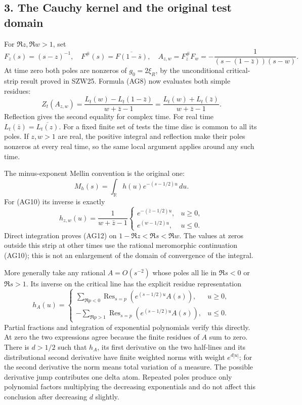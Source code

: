 \documentclass[
  10pt,
  a4paper,
]{article}
\begin{document}
\subsection{3. The Cauchy kernel and the original test
domain}\label{the-cauchy-kernel-and-the-original-test-domain}

For \(\Re z,\Re w>1\), set \[
F_z(s)=(s-z)^{-1},\quad F^\#(s)=\overline{F(1-\bar s)},\quad
A_{z,w}=F_z^\#F_w=-\frac1{(s-(1-\bar z))(s-w)}.
\tag{AG10}
\] At time zero both poles are nonzeros of \(g_0=2\xi_R\), by the
unconditional critical-strip result proved in SZW25. Formula (AG8) now
evaluates both simple residues: \[
Z_t(A_{z,w})=
\frac{L_t(w)-L_t(1-\bar z)}{w+\bar z-1}
=\frac{L_t(w)+L_t(\bar z)}{w+\bar z-1}.
\tag{AG11}
\] Reflection gives the second equality for complex time. For real time
\(L_t(\bar z)=\overline{L_t(z)}\). For a fixed finite set of tests the
time disc is common to all its poles. If \(z,w>1\) are real, the
positive integral and reflection make their poles nonzeros at every real
time, so the same local argument applies around any such time.

The minus-exponent Mellin convention is the original one: \[
M_h(s)=\int_{\mathbb R}h(u)e^{-(s-1/2)u}\,du.
\tag{AG12}
\] For (AG10) its inverse is exactly \[
h_{z,w}(u)=\frac1{w+\bar z-1}
\begin{cases}e^{-(\bar z-1/2)u},&u\ge0,\\
e^{(w-1/2)u},&u\le0.
\end{cases}
\tag{AG13}
\] Direct integration proves (AG12) on \(1-\Re z<\Re s<\Re w\). The
values at zeros outside this strip at other times use the rational
meromorphic continuation (AG10); this is not an enlargement of the
domain of convergence of the integral.

More generally take any rational \(A=O(s^{-2})\) whose poles all lie in
\(\Re s<0\) or \(\Re s>1\). Its inverse on the critical line has the
explicit residue representation \[
h_A(u)=
\begin{cases}
\displaystyle\sum_{\Re p<0}\operatorname{Res}_{s=p}
\left(e^{(s-1/2)u}A(s)\right),&u\ge0,\\
\displaystyle-\sum_{\Re p>1}\operatorname{Res}_{s=p}
\left(e^{(s-1/2)u}A(s)\right),&u\le0.
\end{cases}
\tag{AG14}
\] Partial fractions and integration of exponential polynomials verify
this directly. At zero the two expressions agree because the finite
residues of \(A\) sum to zero. There is \(d>1/2\) such that \(h_A\), its
first derivative on the two half-lines and its distributional second
derivative have finite weighted norms with weight \(e^{d|u|}\); for the
second derivative the norm means total variation of a measure. The
possible derivative jump contributes one delta atom. Repeated poles
produce only polynomial factors multiplying the decreasing exponentials
and do not affect this conclusion after decreasing \(d\) slightly.
\end{document}
